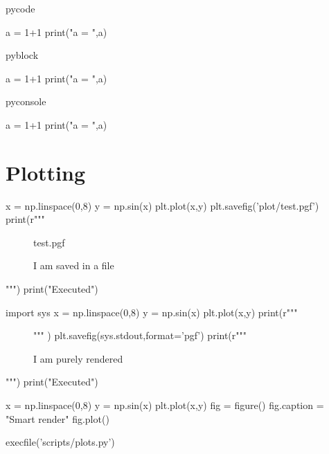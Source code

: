 \documentclass[a4paper]{article}
\begin{document}
pycode
\begin{pycode}
a = 1+1
print("a = ",a)
\end{pycode}

pyblock
\begin{pyblock}
a = 1+1
print("a = ",a)
\end{pyblock}

pyconsole
\begin{pyconsole}
a = 1+1
print("a = ",a)
\end{pyconsole}

\section{Plotting}%
\label{sec:plotting}



\begin{pycode}
x = np.linspace(0,8)
y = np.sin(x)
plt.plot(x,y)
plt.savefig('plot/test.pgf')
print(r"""
\begin{figure}[ht]
	\centering
	{test.pgf}
	\caption{I am saved in a file}
\end{figure} """)
print("Executed")
\end{pycode}

\begin{pycode}
import sys
x = np.linspace(0,8)
y = np.sin(x)
plt.plot(x,y)
print(r"""
\begin{figure}[ht]
	\centering""" )
plt.savefig(sys.stdout,format='pgf')
print(r"""
\caption{I am purely rendered}
\end{figure} """)
print("Executed")
\end{pycode}

\begin{pycode}
x = np.linspace(0,8)
y = np.sin(x)
plt.plot(x,y)
fig = figure()
fig.caption = "Smart render"
fig.plot()
\end{pycode}

\begin{pycode}
execfile('scripts/plots.py')
\end{pycode}
\end{document}

